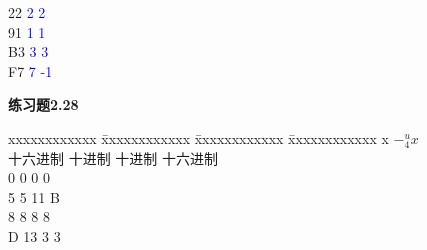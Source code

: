\documentclass{article}
\begin{document}
\begin{CJK}{UTF8}{uyhei}
\begin{tabbing}
	2\hspace{5em}2		\hspace{5em}\textcolor{blue}{2}	\hspace{5em}\textcolor{blue}{2}	\\
	9\hspace{5em}1		\hspace{5em}\textcolor{blue}{1}	\hspace{5em}\textcolor{blue}{1}	\\
	B\hspace{5em}3		\hspace{5em}\textcolor{blue}{3}	\hspace{5em}\textcolor{blue}{3}	\\
	F\hspace{5em}7		\hspace{5em}\textcolor{blue}{7}	\hspace{5em}\textcolor{blue}{-1}	\\
\end{tabbing}
\textbf{练习题2.28}
\begin{tabbing}
	xxxxxxxxxxxx	\=	xxxxxxxxxxxx	\=	xxxxxxxxxxxx	\=	xxxxxxxxxxxx	\kill
			\>	x		\>			\>	$-^u_4x$	\\
	\hspace{1.5em}十六进制	\>	\hspace{1.5em}十进制		\>	\hspace{2.5em}十进制		\>	\hspace{2.5em}十六进制	\\
	\hspace{3em}0	\>	\hspace{2.5em}0	\>	\hspace{3.5em}0	\>	\hspace{4em}0	\\
	\hspace{3em}5	\>	\hspace{2.5em}5	\>	\hspace{3.5em}11\>	\hspace{4em}B	\\
	\hspace{3em}8	\>	\hspace{2.5em}8	\>	\hspace{3.5em}8	\>	\hspace{4em}8	\\
	\hspace{3em}D	\>	\hspace{2.5em}13\>	\hspace{3.5em}3	\>	\hspace{4em}3	\\

\end{tabbing}
\end{CJK}
\end{document}
